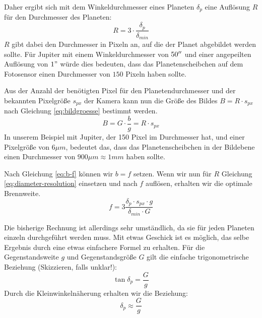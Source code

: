 \documentclass[10pt,a4paper,titlepage]{article}
\begin{document}
Daher ergibt sich mit dem Winkeldurchmesser eines Planeten $\delta_p$ eine Auflösung $R$ für den Durchmesser des Planeten:
\begin{equation}
\label{eq:diameter-resolution}
R = 3 \cdot \frac{\delta_p}{\delta_{min}}
\end{equation}
$R$ gibt dabei den Durchmesser in Pixeln an, auf die der Planet abgebildet werden sollte. Für Jupiter mit einem Winkeldurchmesser von $50\si{\SIUnitSymbolArcsecond}$ und einer angepeilten Auflösung von $1"$ würde dies bedeuten, dass das Planetenscheibchen auf dem Fotosensor einen Durchmesser von $150$ Pixeln haben sollte.

Aus der Anzahl der benötigten Pixel für den Planetendurchmesser und der bekannten Pixelgröße $s_{px}$ der Kamera kann nun die Größe des Bildes $B = R \cdot s_{px}$ nach Gleichung \ref{eq:bildgroesse} bestimmt werden.
\begin{equation}
B = G \cdot \frac{b}{g} = R \cdot s_{px}
\end{equation}
In unserem Beispiel mit Jupiter, der 150 Pixel im Durchmesser hat, und einer Pixelgröße von $6\mu m$, bedeutet das, dass das Planetenscheibchen in der Bildebene einen Durchmesser von $900\mu m \approx 1mm$ haben sollte.

Nach Gleichung \ref{eq:b-f} können wir $b = f$ setzen. Wenn wir nun für $R$ Gleichung \ref{eq:diameter-resolution} einsetzen und nach $f$ auflösen, erhalten wir die optimale Brennweite.
\begin{equation}
f = 3 \frac{\delta_p \cdot s_{px} \cdot g}{\delta_{min} \cdot G}
\end{equation}

Die bisherige Rechnung ist allerdings sehr umständlich, da sie für jeden Planeten einzeln durchgeführt werden muss. Mit etwas Geschick ist es möglich, das selbe Ergebnis durch eine etwas einfachere Formel zu erhalten. Für die Gegenstandsweite $g$ und Gegenstandsgröße $G$ gilt die einfache trigonometrische Beziehung (Skizzieren, falls unklar!):
\begin{equation}
\tan\delta_p = \frac{G}{g}
\end{equation}
Durch die Kleinwinkelnäherung erhalten wir die Beziehung:
\begin{equation}
\label{eq:angular-diameter-small-angle}
\delta_p \approx \frac{G}{g}
\end{equation}
\end{document}
